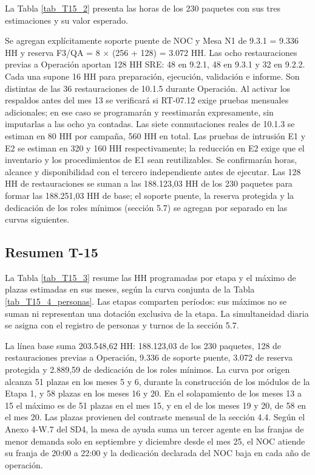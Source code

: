 La Tabla \ref{tab_T15_2} presenta las horas de los 230 paquetes con sus tres estimaciones y su valor esperado.


Se agregan explícitamente soporte puente de NOC y Mesa N1 de 9.3.1 = 9.336 HH y reserva F3/\allowbreak{}QA = 8 \ensuremath{\times} (256 + 128) = 3.072 HH. Las ocho restauraciones previas a Operación aportan 128 HH SRE: 48 en 9.2.1, 48 en 9.3.1 y 32 en 9.2.2. Cada una supone 16 HH para preparación, ejecución, validación e informe. Son distintas de las 36 restauraciones de 10.1.5 durante Operación. Al activar los respaldos antes del mes 13 se verificará si RT-07.12 exige pruebas mensuales adicionales; en ese caso se programarán y reestimarán expresamente, sin imputarlas a las ocho ya contadas. Las siete conmutaciones reales de 10.1.3 se estiman en 80 HH por campaña, 560 HH en total. Las pruebas de intrusión E1 y E2 se estiman en 320 y 160 HH respectivamente; la reducción en E2 exige que el inventario y los procedimientos de E1 sean reutilizables. Se confirmarán horas, alcance y disponibilidad con el tercero independiente antes de ejecutar. Las 128 HH de restauraciones se suman a las 188.123,03 HH de los 230 paquetes para formar las 188.251,03 HH de base; el soporte puente, la reserva protegida y la dedicación de los roles mínimos (sección 5.7) se agregan por separado en las curvas siguientes.

\subsection{Resumen T-15}

La Tabla \ref{tab_T15_3} resume las HH programadas por etapa y el máximo de plazas estimadas en sus meses, según la curva conjunta de la Tabla \ref{tab_T15_4_personas}. Las etapas comparten períodos: sus máximos no se suman ni representan una dotación exclusiva de la etapa. La simultaneidad diaria se asigna con el registro de personas y turnos de la sección 5.7.


La línea base suma 203.548,62 HH: 188.123,03 de los 230 paquetes, 128 de restauraciones previas a Operación, 9.336 de soporte puente, 3.072 de reserva protegida y 2.889,59 de dedicación de los roles mínimos. La curva por origen alcanza 51 plazas en los meses 5 y 6, durante la construcción de los módulos de la Etapa 1, y 58 plazas en los meses 16 y 20. En el solapamiento de los meses 13 a 15 el máximo es de 51 plazas en el mes 15, y en el de los meses 19 y 20, de 58 en el mes 20. Las plazas provienen del contraste mensual de la sección 4.4. Según el Anexo 4-W.7 del SD4, la mesa de ayuda suma un tercer agente en las franjas de menor demanda solo en septiembre y diciembre desde el mes 25, el NOC atiende su franja de 20:00 a 22:00 y la dedicación declarada del NOC baja en cada año de operación.

